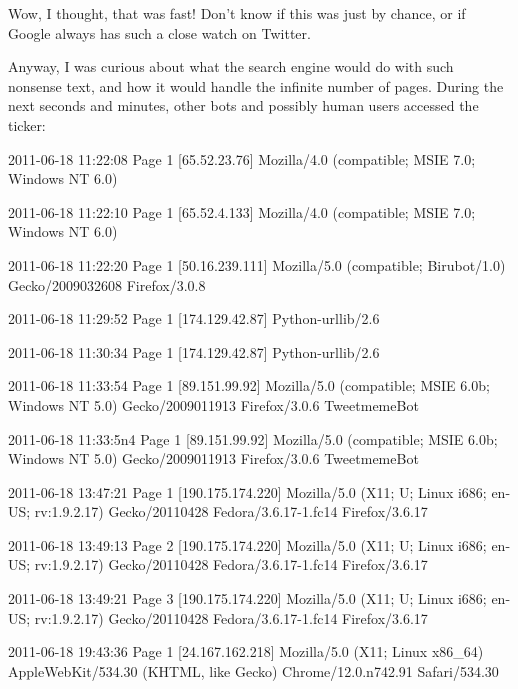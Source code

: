 Wow, I thought, that was fast! Don't know if this was just by chance, or if
Google always has such a close watch on Twitter.

Anyway, I was curious about what the search engine would do with such nonsense
text, and how it would handle the infinite number of pages. During the next
seconds and minutes, other bots and possibly human users accessed the ticker:

\begin{wideverbatim}

  2011-06-18 11:22:08 Page 1 [65.52.23.76] Mozilla/4.0 (compatible;
  MSIE 7.0; Windows NT 6.0)

  2011-06-18 11:22:10 Page 1 [65.52.4.133] Mozilla/4.0 (compatible;
  MSIE 7.0; Windows NT 6.0)

  2011-06-18 11:22:20 Page 1 [50.16.239.111] Mozilla/5.0 (compatible;
  Birubot/1.0) Gecko/2009032608 Firefox/3.0.8

  2011-06-18 11:29:52 Page 1 [174.129.42.87] Python-urllib/2.6

  2011-06-18 11:30:34 Page 1 [174.129.42.87] Python-urllib/2.6

  2011-06-18 11:33:54 Page 1 [89.151.99.92] Mozilla/5.0 (compatible;
  MSIE 6.0b; Windows NT 5.0) Gecko/2009011913 Firefox/3.0.6
  TweetmemeBot

  2011-06-18 11:33:5n4 Page 1 [89.151.99.92] Mozilla/5.0 (compatible;
  MSIE 6.0b; Windows NT 5.0) Gecko/2009011913 Firefox/3.0.6
  TweetmemeBot

  2011-06-18 13:47:21 Page 1 [190.175.174.220] Mozilla/5.0 (X11; U;
  Linux i686; en-US; rv:1.9.2.17) Gecko/20110428 Fedora/3.6.17-1.fc14
  Firefox/3.6.17

  2011-06-18 13:49:13 Page 2 [190.175.174.220] Mozilla/5.0 (X11; U;
  Linux i686; en-US; rv:1.9.2.17) Gecko/20110428 Fedora/3.6.17-1.fc14
  Firefox/3.6.17

  2011-06-18 13:49:21 Page 3 [190.175.174.220] Mozilla/5.0 (X11; U;
  Linux i686; en-US; rv:1.9.2.17) Gecko/20110428 Fedora/3.6.17-1.fc14
  Firefox/3.6.17

  2011-06-18 19:43:36 Page 1 [24.167.162.218] Mozilla/5.0 (X11; Linux
  x86_64) AppleWebKit/534.30 (KHTML, like Gecko) Chrome/12.0.n742.91
  Safari/534.30

\end{wideverbatim}

